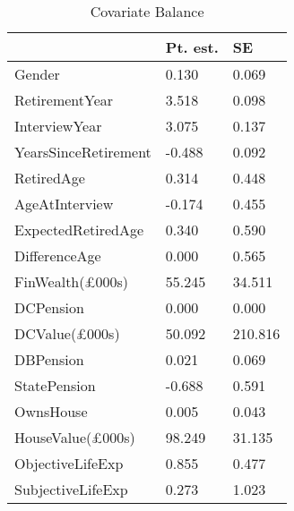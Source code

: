 \begin{table}

\caption{Covariate Balance \label{tab:cov_balance}}
\centering
\begin{tabular}[t]{lll}
\toprule
 & Pt. est. & SE\\
\midrule
Gender & 0.130 & 0.069\\
RetirementYear & 3.518 & 0.098\\
InterviewYear & 3.075 & 0.137\\
YearsSinceRetirement & -0.488 & 0.092\\
RetiredAge & 0.314 & 0.448\\
\addlinespace
AgeAtInterview & -0.174 & 0.455\\
ExpectedRetiredAge & 0.340 & 0.590\\
DifferenceAge & 0.000 & 0.565\\
FinWealth(£000s) & 55.245 & 34.511\\
DCPension & 0.000 & 0.000\\
\addlinespace
DCValue(£000s) & 50.092 & 210.816\\
DBPension & 0.021 & 0.069\\
StatePension & -0.688 & 0.591\\
OwnsHouse & 0.005 & 0.043\\
HouseValue(£000s) & 98.249 & 31.135\\
\addlinespace
ObjectiveLifeExp & 0.855 & 0.477\\
SubjectiveLifeExp & 0.273 & 1.023\\
\bottomrule
\end{tabular}
\end{table}
